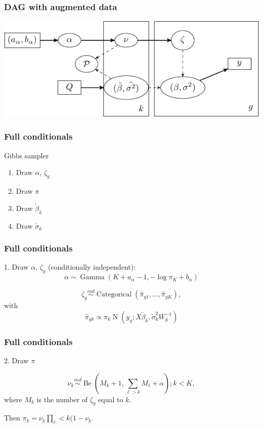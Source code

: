 \documentclass{beamer}
\newcommand{\op}{\operatorname}
\newcommand{\ind}{\stackrel{ind}{\sim}}
\begin{document}
\begin{frame}%
  \frametitle{DAG with augmented data}
  \includegraphics[width=\textwidth]{my_dag_small}
\end{frame}

\begin{frame}%
  \frametitle{Full conditionals}
  \begin{beamerboxesrounded}[upper=upcol,lower=lowcol,shadow=true]{Gibbs sampler}
    \begin{enumerate}
      \item Draw $\alpha$, $\zeta_g$
      \item Draw $\pi$
      \item Draw $\tilde{\beta}_k$
      \item Draw $\tilde{\sigma}_k$
    \end{enumerate}
  \end{beamerboxesrounded}
\end{frame}

\begin{frame}%
  \frametitle{Full conditionals}
  1. Draw $\alpha$, $\zeta_g$ (conditionally independent):\\
  
  \[\alpha \sim \op{Gamma}(K + a_\alpha - 1, -\log \pi_K + b_\alpha)\]
  
  \[\zeta_g \ind \op{Categorical}\left(\hat{\pi}_{g1},\ldots,\hat{\pi}_{gK} \right),\]
  with
  \[\hat{\pi}_{gk} \propto \pi_k \op{N}\left( y_g;X\tilde{\beta}_k,\tilde{\sigma}_k^2 W_g^{-1} \right)\]
\end{frame}

\begin{frame}%
  \frametitle{Full conditionals}
  2. Draw $\pi$
  
  \[\nu_k \ind \op{Be}(M_k + 1, \sum_{\ell>k}M_\ell + \alpha); k < K,\]
  where $M_k$ is the number of $\zeta_g$ equal to $k$.
  
  Then $\pi_k = \nu_k \prod_\ell<k(1-\nu_k$.
\end{frame}
\end{document}

